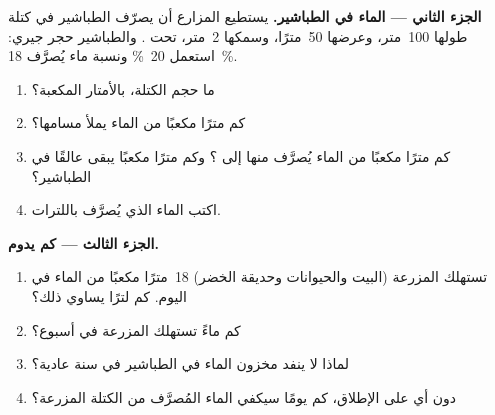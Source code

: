 \begin{problem}
\medskip
\noindent\textbf{الجزء الثاني --- الماء في الطباشير.}
يستطيع المزارع أن يصرّف الطباشير   في كتلة طولها 100~متر،
وعرضها 50~مترًا، وسمكها 2~متر، تحت . والطباشير حجر جيري:
استعمل  20~\% ونسبة ماء يُصرَّف 18~\%.
\begin{enumerate}[resume]
  \item ما حجم الكتلة، بالأمتار المكعبة؟
  \item كم مترًا مكعبًا من الماء يملأ مسامها؟
  \item كم مترًا مكعبًا من الماء يُصرَّف منها إلى ؟ وكم مترًا
        مكعبًا يبقى عالقًا في الطباشير؟
  \item اكتب الماء الذي يُصرَّف باللترات.
\end{enumerate}

\medskip
\noindent\textbf{الجزء الثالث --- كم يدوم.}
\begin{enumerate}[resume]
  \item تستهلك المزرعة (البيت والحيوانات وحديقة الخضر) 18~مترًا مكعبًا
        من الماء في اليوم. كم لترًا يساوي ذلك؟
  \item كم ماءً تستهلك المزرعة في أسبوع؟
  \item لماذا لا ينفد مخزون الماء في الطباشير في سنة
        عادية؟
  \item دون أي  على الإطلاق، كم يومًا سيكفي الماء المُصرَّف
        من الكتلة المزرعة؟
\end{enumerate}
\end{problem}
